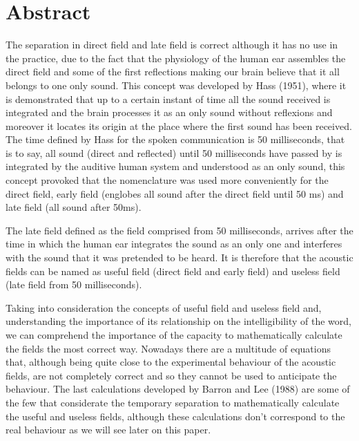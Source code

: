 
\chapter*{Abstract}
\thispagestyle{empty}
The separation in direct field and late field is correct although it has no use in the practice, due to the fact that the physiology of the human ear assembles the direct field and some of the first reflections making our brain believe that it all belongs to one only sound. This concept was developed by Hass (1951), where it is demonstrated that up to a certain instant of time all the sound received is integrated and the brain processes it as an only sound without reflexions and moreover it locates its origin at the place where the first sound has been received. The time defined by Hass for the spoken communication is 50 milliseconds, that is to say, all sound (direct and reflected) until 50 milliseconds have passed by is integrated by the auditive human system and understood as an only sound, this concept provoked that the nomenclature was used more conveniently for the direct field, early field (englobes all sound after the direct field until 50 ms) and late field (all sound after 50ms).

The late field defined as the field comprised from 50 milliseconds, arrives after the time in which the human ear integrates the sound as an only one and interferes with the sound that it was pretended to be heard. It is therefore that the acoustic fields can be named as useful field (direct field and early field) and useless field (late field from 50 milliseconds).

Taking into consideration the concepts of useful field and useless field and, understanding the importance of its relationship on the intelligibility of the word, we can comprehend the importance of the capacity to mathematically calculate the fields the most correct way. Nowadays there are a multitude of equations that, although being quite close to the experimental behaviour of the acoustic fields, are not completely correct and so they cannot be used to anticipate the behaviour. The last calculations developed by Barron and Lee (1988) are some of the few that considerate the temporary separation to mathematically calculate the useful and useless fields, although these calculations don’t correspond to the real behaviour as we will see later on this paper.


